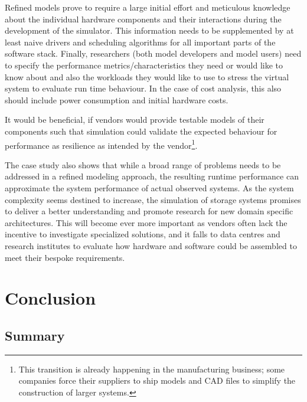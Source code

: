 \documentclass{../../template/esiwace-report}
\begin{document}
Refined models prove to require a large initial effort and meticulous knowledge about the individual hardware components and their interactions during the development of the simulator.  This information needs to be supplemented by at least naive drivers and scheduling algorithms for all important parts of the software stack. 
Finally, researchers (both model developers and model users) need to specify the performance metrics/characteristics they need or would like to know about and also the workloads they would like to use to stress the virtual system to evaluate run time behaviour. In the case of cost analysis, this also should include power consumption and initial hardware costs.

It would be beneficial, if vendors would provide testable models of their components such that simulation could validate the expected behaviour for performance as resilience as intended by the vendor\footnote{This transition is already happening in the manufacturing business; some companies force their suppliers to ship models and CAD files to simplify the construction of larger systems.}.

The case study also shows that while a broad range of problems needs to be addressed in a refined modeling approach, the resulting runtime performance can approximate the system performance of actual observed systems.
As the system complexity seems destined to increase, the simulation of storage systems promises to deliver a better understanding and promote research for new domain specific architectures. This will become ever more important as vendors 
 often lack the incentive to investigate specialized solutions, and it falls to data centres and research institutes to evaluate how hardware and software could be assembled to meet their bespoke requirements.





\chapter{Conclusion}
\label{sec:conclusion}


\section{Summary}
\end{document}
